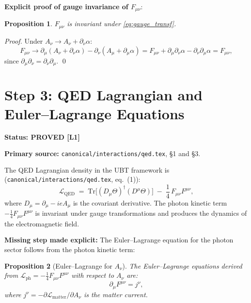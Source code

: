 \documentclass[11pt,a4paper]{article}
\newtheorem{proposition}{Proposition}
\newcommand{\Lone}{\textbf{[L1]}}
\newcommand{\PROVED}{\textbf{PROVED}}
\begin{document}
\medskip
\noindent\textbf{Explicit proof of gauge invariance of $F_{\mu\nu}$}:
\begin{proposition}
$F_{\mu\nu}$ is invariant under \eqref{eq:gauge_transf}.
\end{proposition}
\begin{proof}
Under $A_\nu \to A_\nu + \partial_\nu\alpha$:
\begin{equation}
  F_{\mu\nu} \to \partial_\mu(A_\nu + \partial_\nu\alpha)
              - \partial_\nu(A_\mu + \partial_\mu\alpha)
  = F_{\mu\nu} + \partial_\mu\partial_\nu\alpha
              - \partial_\nu\partial_\mu\alpha
  = F_{\mu\nu},
\end{equation}
since $\partial_\mu\partial_\nu = \partial_\nu\partial_\mu$. \qed
\end{proof}

\section{Step 3: QED Lagrangian and Euler--Lagrange Equations}

\noindent\textbf{Status: \PROVED{} \Lone}

\noindent\textbf{Primary source:}
\texttt{canonical/interactions/qed.tex}, \S1 and \S3.

\medskip

The QED Lagrangian density in the UBT framework is
(\texttt{canonical/interactions/qed.tex}, eq.\ (1)):
\begin{equation}\label{eq:LQED}
  \mathcal{L}_{\mathrm{QED}}
  \;=\;
  \mathrm{Tr}\bigl[(D_\mu\Theta)^\dagger (D^\mu\Theta)\bigr]
  \;-\;
  \frac{1}{4}\,F_{\mu\nu}F^{\mu\nu},
\end{equation}
where $D_\mu = \partial_\mu - ieA_\mu$ is the covariant derivative.
The photon kinetic term $-\tfrac{1}{4}F_{\mu\nu}F^{\mu\nu}$ is invariant under
gauge transformations and produces the dynamics of the electromagnetic field.

\noindent\textbf{Missing step made explicit:} The Euler--Lagrange equation
for the photon sector follows from the photon kinetic term:

\begin{proposition}[Euler--Lagrange for $A_\nu$]
\label{prop:EL}
The Euler--Lagrange equations derived from
$\mathcal{L}_{\mathrm{ph}} = -\tfrac{1}{4}F_{\mu\nu}F^{\mu\nu}$
with respect to $A_\nu$ are:
\begin{equation}\label{eq:ELeq}
  \partial_\mu F^{\mu\nu} = j^\nu,
\end{equation}
where $j^\nu = -\partial\mathcal{L}_{\mathrm{matter}}/\partial A_\nu$
is the matter current.
\end{proposition}
\end{document}
